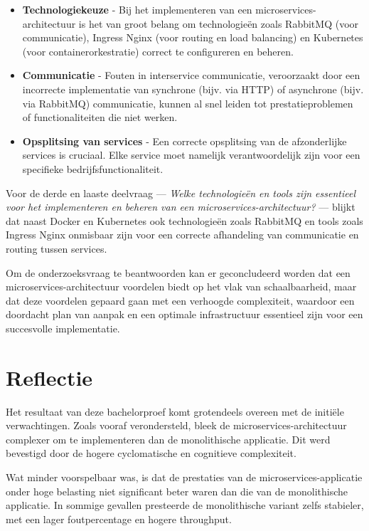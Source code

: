 \begin{itemize}
	\item \textbf{Technologiekeuze} - Bij het implementeren van een microservices-architectuur is het van groot belang om technologieën zoals RabbitMQ (voor communicatie), Ingress Nginx (voor routing en load balancing) en Kubernetes (voor containerorkestratie) correct te configureren en beheren.
	\item \textbf{Communicatie} - Fouten in interservice communicatie, veroorzaakt door een incorrecte implementatie van synchrone (bijv. via HTTP) of asynchrone (bijv. via RabbitMQ) communicatie, kunnen al snel leiden tot prestatieproblemen of functionaliteiten die niet werken.
	\item \textbf{Opsplitsing van services} - Een correcte opsplitsing van de afzonderlijke services is cruciaal. Elke service moet namelijk verantwoordelijk zijn voor een specifieke bedrijfsfunctionaliteit.
\end{itemize}

Voor de derde en laaste deelvraag — \textit{Welke technologieën en tools zijn essentieel voor het implementeren en beheren van een microservices-architectuur?} — blijkt dat naast Docker en Kubernetes ook technologieën zoals RabbitMQ en tools zoals Ingress Nginx onmisbaar zijn voor een correcte afhandeling van communicatie en routing tussen services.\newline

Om de onderzoeksvraag te beantwoorden kan er geconcludeerd worden dat een microservices-architectuur voordelen biedt op het vlak van schaalbaarheid, maar dat deze voordelen gepaard gaan met een verhoogde complexiteit, waardoor een doordacht plan van aanpak en een optimale infrastructuur essentieel zijn voor een succesvolle implementatie.

\section{Reflectie}

Het resultaat van deze bachelorproef komt grotendeels overeen met de initiële verwachtingen. 
Zoals vooraf verondersteld, bleek de microservices-architectuur complexer om te implementeren dan de monolithische applicatie. Dit werd bevestigd door de hogere cyclomatische en cognitieve complexiteit.

Wat minder voorspelbaar was, is dat de prestaties van de microservices-applicatie onder hoge belasting niet significant beter waren dan die van de monolithische applicatie. In sommige gevallen presteerde de monolithische variant zelfs stabieler, met een lager foutpercentage en hogere throughput.

